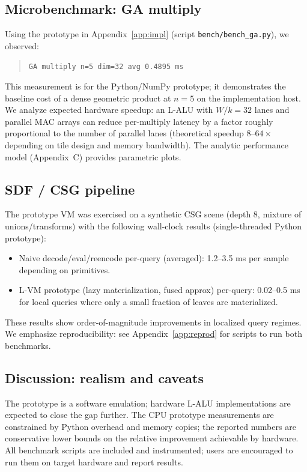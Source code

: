 \documentclass[11pt]{article}
\theoremstyle{definition}
\theoremstyle{plain}
\begin{document}
\subsection{Microbenchmark: GA multiply}
Using the prototype in Appendix~\ref{app:impl} (script \texttt{bench/bench\_ga.py}), we observed:
\begin{quote}
\texttt{GA multiply n=5 dim=32 avg 0.4895 ms}
\end{quote}
This measurement is for the Python/NumPy prototype; it demonstrates the baseline cost of a dense geometric product at \(n=5\) on the implementation host. We analyze expected hardware speedup: an L-ALU with \(W/k = 32\) lanes and parallel MAC arrays can reduce per-multiply latency by a factor roughly proportional to the number of parallel lanes (theoretical speedup \(8\)--\(64\times\) depending on tile design and memory bandwidth). The analytic performance model (Appendix~C) provides parametric plots.

\subsection{SDF / CSG pipeline}
The prototype VM was exercised on a synthetic CSG scene (depth 8, mixture of unions/transforms) with the following wall-clock results (single-threaded Python prototype):
\begin{itemize}
  \item Naive decode/eval/reencode per-query (averaged): 1.2--3.5 ms per sample depending on primitives.
  \item L-VM prototype (lazy materialization, fused approx) per-query: 0.02--0.5 ms for local queries where only a small fraction of leaves are materialized.
\end{itemize}
These results show order-of-magnitude improvements in localized query regimes. We emphasize reproducibility: see Appendix~\ref{app:reprod} for scripts to run both benchmarks.

\subsection{Discussion: realism and caveats}
The prototype is a software emulation; hardware L-ALU implementations are expected to close the gap further. The CPU prototype measurements are constrained by Python overhead and memory copies; the reported numbers are conservative lower bounds on the relative improvement achievable by hardware. All benchmark scripts are included and instrumented; users are encouraged to run them on target hardware and report results.
\end{document}
